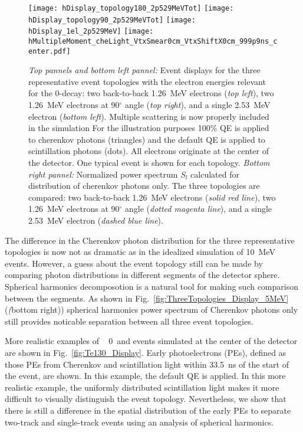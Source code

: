 \begin{figure*}[h]
  \centering
  \texttt{[image: hDisplay\_topology180\_2p529MeVTot]}
  \texttt{[image: hDisplay\_topology90\_2p529MeVTot]}
  \texttt{[image: hDisplay\_1el\_2p529MeV]}
  \texttt{[image: hMultipleMoment\_cheLight\_VtxSmear0cm\_VtxShiftX0cm\_999p9ns\_center.pdf]}
  \caption{\emph{Top pannels and bottom left pannel:} Event displays for the three representative event topologies with the electron energies relevant 
    for the {\Te} 0{\nbb}-decay: two back-to-back 1.26~MeV electrons (\emph{top left}), two 1.26~MeV electrons at 90$^{\circ}$ angle 
    (\emph{top right}), and a single 2.53~MeV electron (\emph{bottom left}). Multiple scattering is now properly included in the simulation
    For the illustration purposes 100\% QE is applied to cherenkov photons (triangles) and the default QE is applied to scintillation 
    photons (dots). All electrons originate at the center of the detector. One typical event is shown for each topology.
    \emph{Bottom right pannel:} Normalized power spectrum $S_l$ calculated for distribution of cherenkov photons only. The three
    topologies are compared: two back-to-back 1.26~MeV electrons (\emph{solid red line}), two 1.26~MeV electrons at 90$^{\circ}$ angle
    (\emph{dotted magenta line}), and a single 2.53~MeV electron (\emph{dashed blue line}).}
  \label{fig:ThreeTopologies_Display}
\end{figure*}


The difference in the Cherenkov photon distribution for the three representative topologies is now not as dramatic as in the idealized 
simulation of 10~MeV events. However, a guess about the event topology still can be made by comparing photon distributions in different 
segments of the detector sphere. Spherical harmonics decomposotion is a natural tool for making such comparison between the segments. 
As shown in Fig.~\ref{fig:ThreeTopologies_Display_5MeV}(\emph(bottom right)) spherical harmonics power spectrum of Cherenkov photons only
still provides noticable separation between all three event topologies.


More realistic examples of \Te~ 0\nbb~and \B events simulated at the center of the detector are shown in Fig.~\ref{fig:Te130_Display}. Early photoelectrons (PEs), defined as those PEs from Cherenkov and scintillation light within 33.5~ns of the start of the event, are shown. In this example, the default QE is applied.  In this more realistic example, the uniformly distributed scintillation light makes it more difficult to visually distinguish the event topology. Nevertheless, we show that there is still a difference in the spatial distribution of the early PEs to separate two-track and single-track events using an analysis of spherical harmonics.

